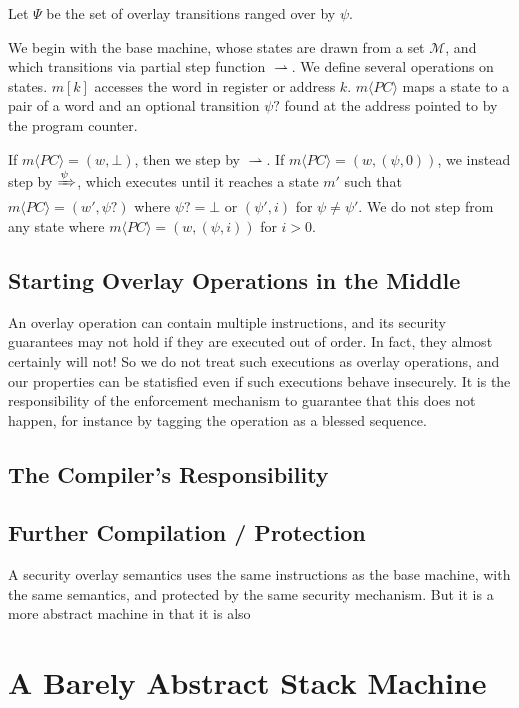 \documentclass{article}
\begin{document}
Let \(\Psi\) be the set of overlay transitions ranged over by \(\psi\).

We begin with the base machine, whose states are drawn from a set \(\mathcal{M}\),
and which transitions via partial step function \(\rightharpoonup\).
We define several operations on states. \(m[k]\) accesses the word in register
or address \(k\). \(m\langle PC \rangle\) maps a state to a pair of a word
and an optional transition \(\psi?\) found at the address pointed to by the
program counter.

If \(m\langle PC \rangle = (w, \bot)\), then we step by \(\rightharpoonup\).
If \(m\langle PC \rangle = (w, (\psi,0))\), we instead step by \(\xRightarrow{\psi}\),
which executes until it reaches a state \(m'\) such that \(m\langle PC \rangle = (w',\psi?)\)
where \(\psi? = \bot\) or \((\psi',i)\) for \(\psi \not = \psi'\). We do not step
from any state where \(m\langle PC \rangle = (w, (\psi,i))\) for \(i > 0\).

\subsection{Starting Overlay Operations in the Middle}

An overlay operation can contain multiple instructions, and its security guarantees
may not hold if they are executed out of order. In fact, they almost certainly will not!
So we do not treat such executions as overlay operations, and our properties can be
statisfied even if such executions behave insecurely. It is the responsibility of the
enforcement mechanism to guarantee that this does not happen, for instance by tagging
the operation as a blessed sequence.

\subsection{The Compiler's Responsibility}

\subsection{Further Compilation / Protection}

A security overlay semantics uses the same instructions as the base machine,
with the same semantics, and protected by the same security mechanism. But it
is a more abstract machine in that it is also 

\section{A Barely Abstract Stack Machine}
\end{document}
